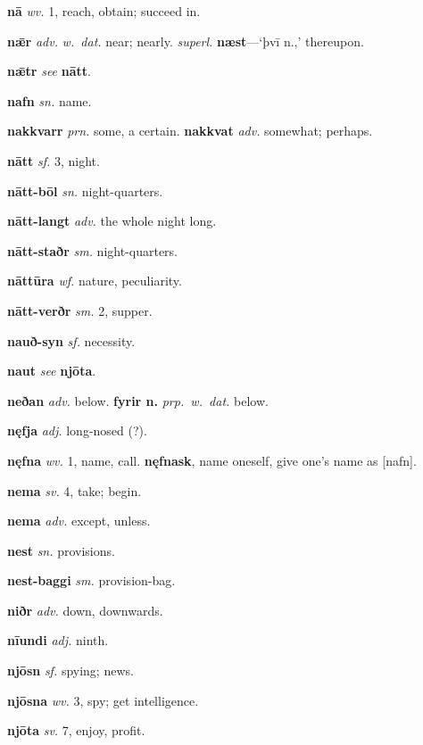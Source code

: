 \documentclass[12pt,letterpaper]{book}
\begin{document}
\noindent
\textbf{nā} \textit{wv.} 1, reach, obtain; succeed in.

\noindent
\textbf{nǣr} \textit{adv.} \textit{w.\ dat.} near; nearly.  \textit{superl.}
	\textbf{næst}---`þvī n.,' thereupon.

\noindent
\textbf{nǣtr} \textit{} \textit{see} \textbf{nātt}.

\noindent
\textbf{nafn} \textit{sn.} name.

\noindent
\textbf{nakkvarr} \textit{prn.} some, a certain.  \textbf{nakkvat} \textit{adv.}
	somewhat; perhaps.

\noindent
\textbf{nātt} \textit{sf.} 3, night.

\noindent
\textbf{nātt-bōl} \textit{sn.} night-quarters.

\noindent
\textbf{nātt-langt} \textit{adv.} the whole night long.

\noindent
\textbf{nātt-staðr} \textit{sm.} night-quarters.

\noindent
\textbf{nāttūra} \textit{wf.} nature, peculiarity.

\noindent
\textbf{nātt-verðr} \textit{sm.} 2, supper.

\noindent
\textbf{nauð-syn} \textit{sf.} necessity.

\noindent
\textbf{naut} \textit{} \textit{see} \textbf{njōta}.

\noindent
\textbf{neðan} \textit{adv.} below.  \textbf{fyrir n.} \textit{prp.\
	w.\ dat.} below.

\noindent
\textbf{nęfja} \textit{adj.} long-nosed (?).

\noindent
\textbf{nęfna} \textit{wv.} 1, name, call.  \textbf{nęfnask}, name
	oneself, give one's name as [nafn].

\noindent
\textbf{nema} \textit{sv.} 4, take; begin.

\noindent
\textbf{nema} \textit{adv.} except, unless.

\noindent
\textbf{nest} \textit{sn.} provisions.

\noindent
\textbf{nest-baggi} \textit{sm.} provision-bag.

\noindent
\textbf{niðr} \textit{adv.} down, downwards.

\noindent
\textbf{nīundi} \textit{adj.} ninth.

\noindent
\textbf{njōsn} \textit{sf.} spying; news.

\noindent
\textbf{njōsna} \textit{wv.} 3, spy; get intelligence.

\noindent
\textbf{njōta} \textit{sv.} 7, enjoy, profit.
\end{document}
